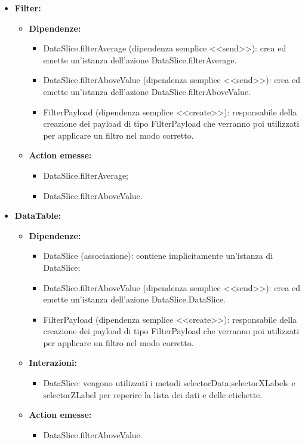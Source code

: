 \begin{itemize}
    \item \textbf{Filter:}
    \begin{itemize}
        \item \textbf{Dipendenze:}
        \begin{itemize}
            \item DataSlice.filterAverage (dipendenza semplice <<send>>): crea ed emette un’istanza dell’azione DataSlice.filterAverage.
            \item DataSlice.filterAboveValue (dipendenza semplice <<send>>): crea ed emette un’istanza dell’azione DataSlice.filterAboveValue.
            \item FilterPayload (dipendenza semplice <<create>>): responsabile della creazione dei payload di tipo FilterPayload che verranno poi utilizzati per applicare un filtro nel modo corretto.
        \end{itemize} 
        \item \textbf{Action emesse:}
        \begin{itemize}
            \item DataSlice.filterAverage;
            \item DataSlice.filterAboveValue.
        \end{itemize} 
    \end{itemize}

    \item \textbf{DataTable:}
    \begin{itemize}
        \item \textbf{Dipendenze:}
        \begin{itemize}
            \item DataSlice (associazione): contiene implicitamente un'istanza di DataSlice;
            \item DataSlice.filterAboveValue (dipendenza semplice <<send>>): crea ed emette un’istanza dell’azione DataSlice.DataSlice.
            \item FilterPayload (dipendenza semplice <<create>>): responsabile della creazione dei payload di tipo FilterPayload che verranno poi utilizzati per applicare un filtro nel modo corretto.
        \end{itemize} 
        \item \textbf{Interazioni:}
        \begin{itemize}
            \item DataSlice: vengono utilizzati i metodi selectorData,selectorXLabels e selectorZLabel per reperire la lista dei dati e delle etichette.
        \end{itemize} 
        \item \textbf{Action emesse:}
        \begin{itemize}
            \item DataSlice.filterAboveValue.
        \end{itemize} 
    \end{itemize}


\end{itemize}

